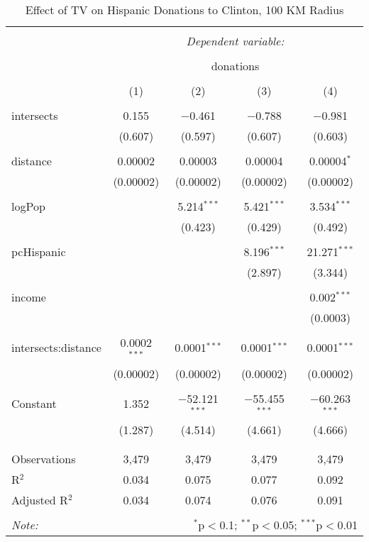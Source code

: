 
\begin{table}[!htbp] \centering 
  \caption{Effect of TV on Hispanic Donations to Clinton, 100 KM Radius} 
  \label{} 
\begin{tabular}{@{\extracolsep{-5pt}}lcccc} 
\\[-1.8ex]\hline 
\hline \\[-1.8ex] 
 & \multicolumn{4}{c}{\textit{Dependent variable:}} \\ 
\cline{2-5} 
\\[-1.8ex] & \multicolumn{4}{c}{donations} \\ 
\\[-1.8ex] & (1) & (2) & (3) & (4)\\ 
\hline \\[-1.8ex] 
 intersects & 0.155 & $-$0.461 & $-$0.788 & $-$0.981 \\ 
  & (0.607) & (0.597) & (0.607) & (0.603) \\ 
  & & & & \\ 
 distance & 0.00002 & 0.00003 & 0.00004 & 0.00004$^{*}$ \\ 
  & (0.00002) & (0.00002) & (0.00002) & (0.00002) \\ 
  & & & & \\ 
 logPop &  & 5.214$^{***}$ & 5.421$^{***}$ & 3.534$^{***}$ \\ 
  &  & (0.423) & (0.429) & (0.492) \\ 
  & & & & \\ 
 pcHispanic &  &  & 8.196$^{***}$ & 21.271$^{***}$ \\ 
  &  &  & (2.897) & (3.344) \\ 
  & & & & \\ 
 income &  &  &  & 0.002$^{***}$ \\ 
  &  &  &  & (0.0003) \\ 
  & & & & \\ 
 intersects:distance & 0.0002$^{***}$ & 0.0001$^{***}$ & 0.0001$^{***}$ & 0.0001$^{***}$ \\ 
  & (0.00002) & (0.00002) & (0.00002) & (0.00002) \\ 
  & & & & \\ 
 Constant & 1.352 & $-$52.121$^{***}$ & $-$55.455$^{***}$ & $-$60.263$^{***}$ \\ 
  & (1.287) & (4.514) & (4.661) & (4.666) \\ 
  & & & & \\ 
\hline \\[-1.8ex] 
Observations & 3,479 & 3,479 & 3,479 & 3,479 \\ 
R$^{2}$ & 0.034 & 0.075 & 0.077 & 0.092 \\ 
Adjusted R$^{2}$ & 0.034 & 0.074 & 0.076 & 0.091 \\ 
\hline 
\hline \\[-1.8ex] 
\textit{Note:}  & \multicolumn{4}{r}{$^{*}$p$<$0.1; $^{**}$p$<$0.05; $^{***}$p$<$0.01} \\ 
\end{tabular} 
\end{table} 
